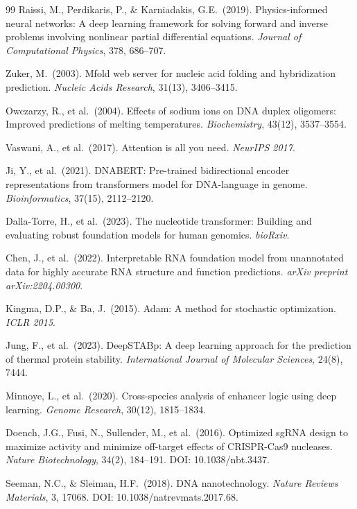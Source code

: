 \documentclass[12pt,oneside,letterpaper]{report}
\begin{document}
\begin{singlespace}
\begin{thebibliography}{99}
Raissi, M., Perdikaris, P., \& Karniadakis, G.E.\ (2019).
Physics-informed neural networks: A deep learning framework for solving forward and inverse problems involving nonlinear partial differential equations.
\textit{Journal of Computational Physics}, 378, 686--707.

Zuker, M.\ (2003).
Mfold web server for nucleic acid folding and hybridization prediction.
\textit{Nucleic Acids Research}, 31(13), 3406--3415.

Owczarzy, R., et al.\ (2004).
Effects of sodium ions on DNA duplex oligomers: Improved predictions of melting temperatures.
\textit{Biochemistry}, 43(12), 3537--3554.

Vaswani, A., et al.\ (2017).
Attention is all you need.
\textit{NeurIPS 2017}.

Ji, Y., et al.\ (2021).
DNABERT: Pre-trained bidirectional encoder representations from transformers model for DNA-language in genome.
\textit{Bioinformatics}, 37(15), 2112--2120.

Dalla-Torre, H., et al.\ (2023).
The nucleotide transformer: Building and evaluating robust foundation models for human genomics.
\textit{bioRxiv}.

Chen, J., et al.\ (2022).
Interpretable RNA foundation model from unannotated data for highly accurate RNA structure and function predictions.
\textit{arXiv preprint arXiv:2204.00300}.

Kingma, D.P., \& Ba, J.\ (2015).
Adam: A method for stochastic optimization.
\textit{ICLR 2015}.

Jung, F., et al.\ (2023).
DeepSTABp: A deep learning approach for the prediction of thermal protein stability.
\textit{International Journal of Molecular Sciences}, 24(8), 7444.

Minnoye, L., et al.\ (2020).
Cross-species analysis of enhancer logic using deep learning.
\textit{Genome Research}, 30(12), 1815--1834.

Doench, J.G., Fusi, N., Sullender, M., et al.\ (2016).
Optimized sgRNA design to maximize activity and minimize off-target effects of CRISPR-Cas9 nucleases.
\textit{Nature Biotechnology}, 34(2), 184--191. DOI: 10.1038/nbt.3437.

Seeman, N.C., \& Sleiman, H.F.\ (2018).
DNA nanotechnology.
\textit{Nature Reviews Materials}, 3, 17068. DOI: 10.1038/natrevmats.2017.68.

\end{thebibliography}
\end{singlespace}
\end{document}
